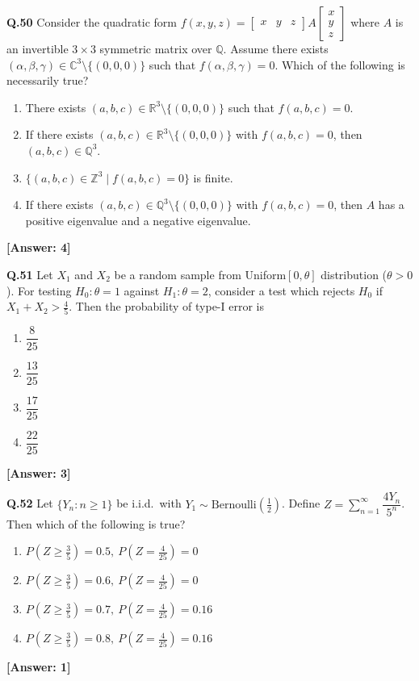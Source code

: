 \documentclass[12pt,a4paper]{article}
\newcommand{\ans}[1]{\quad\textcolor{anscolor}{\textbf{[Answer: #1]}}}
\begin{document}
\textbf{Q.50} Consider the quadratic form $f(x,y,z)=\begin{bmatrix}x&y&z\end{bmatrix}A\begin{bmatrix}x\\y\\z\end{bmatrix}$ where $A$ is an invertible $3\times3$ symmetric matrix over $\mathbb{Q}$. Assume there exists $(\alpha,\beta,\gamma)\in\mathbb{C}^3\setminus\{(0,0,0)\}$ such that $f(\alpha,\beta,\gamma)=0$. Which of the following is necessarily true?
\begin{enumerate}[label=\arabic*.]
\item There exists $(a,b,c)\in\mathbb{R}^3\setminus\{(0,0,0)\}$ such that $f(a,b,c)=0$.
\item If there exists $(a,b,c)\in\mathbb{R}^3\setminus\{(0,0,0)\}$ with $f(a,b,c)=0$, then $(a,b,c)\in\mathbb{Q}^3$.
\item $\{(a,b,c)\in\mathbb{Z}^3\mid f(a,b,c)=0\}$ is finite.
\item If there exists $(a,b,c)\in\mathbb{Q}^3\setminus\{(0,0,0)\}$ with $f(a,b,c)=0$, then $A$ has a positive eigenvalue and a negative eigenvalue.
\end{enumerate}\ans{4}

\textbf{Q.51} Let $X_1$ and $X_2$ be a random sample from Uniform$[0,\theta]$ distribution ($\theta>0$). For testing $H_0:\theta=1$ against $H_1:\theta=2$, consider a test which rejects $H_0$ if $X_1+X_2>\tfrac{4}{5}$. Then the probability of type-I error is
\begin{enumerate}[label=\arabic*.]
\item $\dfrac{8}{25}$ \item $\dfrac{13}{25}$ \item $\dfrac{17}{25}$ \item $\dfrac{22}{25}$
\end{enumerate}\ans{3}

\textbf{Q.52} Let $\{Y_n:n\ge1\}$ be i.i.d.\ with $Y_1\sim\text{Bernoulli}(\tfrac{1}{2})$. Define $Z=\sum_{n=1}^\infty\dfrac{4Y_n}{5^n}$. Then which of the following is true?
\begin{enumerate}[label=\arabic*.]
\item $P(Z\ge\tfrac{3}{5})=0.5,\ P(Z=\tfrac{4}{25})=0$
\item $P(Z\ge\tfrac{3}{5})=0.6,\ P(Z=\tfrac{4}{25})=0$
\item $P(Z\ge\tfrac{3}{5})=0.7,\ P(Z=\tfrac{4}{25})=0.16$
\item $P(Z\ge\tfrac{3}{5})=0.8,\ P(Z=\tfrac{4}{25})=0.16$
\end{enumerate}\ans{1}
\end{document}
